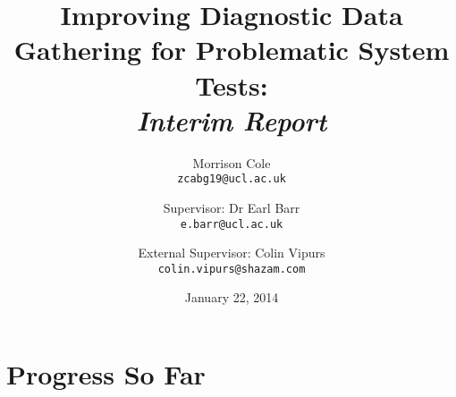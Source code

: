 
\setcounter{oldSectionCounter}{\value{section}}
\setcounter{oldSubSectionCounter}{\value{subsection}}
\setcounter{oldPageCounter}{\value{page}}

\setcounter{section}{0}

\title{
	Improving Diagnostic Data Gathering for Problematic System Tests:\\
	\itshape{Interim Report}
}
\author{
	Morrison Cole\\
	\texttt{zcabg19@ucl.ac.uk}
	\and
	Supervisor: Dr Earl Barr\\
	\texttt{e.barr@ucl.ac.uk}
	\and
	External Supervisor: Colin Vipurs\\
	\texttt{colin.vipurs@shazam.com}
}
\date{January 22, 2014}

\maketitle

\tocless\section{Progress So Far}

